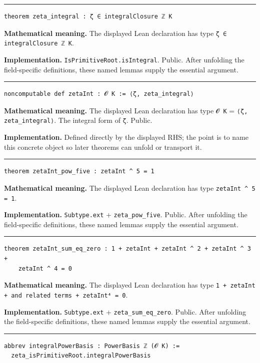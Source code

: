 \documentclass[UTF8,a4paper,11pt,fontset=fandol]{ctexart}
\theoremstyle{definition}
\newcommand{\statementsep}{\par\medskip\hrule\medskip}
\begin{document}
\statementsep
\begin{verbatim}
theorem zeta_integral : ζ ∈ integralClosure ℤ K
\end{verbatim}
\noindent\textbf{Mathematical meaning.} The displayed Lean declaration has type \texttt{ζ ∈ integralClosure ℤ K}.\par
\noindent\textbf{Implementation.} \texttt{IsPrimitiveRoot.\allowbreak{}isIntegral}. Public. After unfolding the field-specific definitions, these named lemmas supply the essential argument.\par
\statementsep
\begin{verbatim}
noncomputable def zetaInt : 𝓞 K := ⟨ζ, zeta_integral⟩
\end{verbatim}
\noindent\textbf{Mathematical meaning.} The displayed Lean declaration has type \texttt{𝓞 K} = \texttt{⟨ζ, zeta\_\allowbreak{}integral⟩}. The integral form of \texttt{ζ}. Public.\par
\noindent\textbf{Implementation.} Defined directly by the displayed RHS; the point is to name this concrete object so later theorems can unfold or transport it.\par
\statementsep
\begin{verbatim}
theorem zetaInt_pow_five : zetaInt ^ 5 = 1
\end{verbatim}
\noindent\textbf{Mathematical meaning.} The displayed Lean declaration has type \texttt{zetaInt \textasciicircum{} 5 = 1}.\par
\noindent\textbf{Implementation.} \texttt{Subtype.\allowbreak{}ext} + \texttt{zeta\_\allowbreak{}pow\_\allowbreak{}five}. Public. After unfolding the field-specific definitions, these named lemmas supply the essential argument.\par
\statementsep
\begin{verbatim}
theorem zetaInt_sum_eq_zero : 1 + zetaInt + zetaInt ^ 2 + zetaInt ^ 3 +
    zetaInt ^ 4 = 0
\end{verbatim}
\noindent\textbf{Mathematical meaning.} The displayed Lean declaration has type \texttt{1 + zetaInt + and related terms + zetaInt⁴ = 0}.\par
\noindent\textbf{Implementation.} \texttt{Subtype.\allowbreak{}ext} + \texttt{zeta\_\allowbreak{}sum\_\allowbreak{}eq\_\allowbreak{}zero}. Public. After unfolding the field-specific definitions, these named lemmas supply the essential argument.\par
\statementsep
\begin{verbatim}
abbrev integralPowerBasis : PowerBasis ℤ (𝓞 K) :=
  zeta_isPrimitiveRoot.integralPowerBasis
\end{verbatim}
\end{document}
